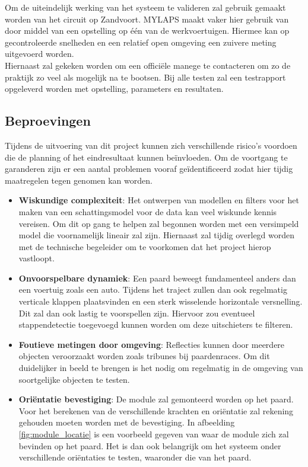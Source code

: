 Om de uiteindelijk werking van het systeem te valideren zal gebruik gemaakt worden van het circuit op Zandvoort. MYLAPS maakt vaker hier gebruik van door middel van een opstelling op één van de werkvoertuigen. Hiermee kan op gecontroleerde snelheden en een relatief open omgeving een zuivere meting uitgevoerd worden.\\

Hiernaast zal gekeken worden om een officiële manege te contacteren om zo de praktijk zo veel als mogelijk na te bootsen. Bij alle testen zal een testrapport opgeleverd worden met opstelling, parameters en resultaten.


\subsection{Beproevingen}
Tijdens de uitvoering van dit project kunnen zich verschillende risico's voordoen die de planning of het eindresultaat kunnen beïnvloeden. Om de voortgang te garanderen zijn er een aantal problemen vooraf geïdentificeerd zodat hier tijdig maatregelen tegen genomen kan worden. \\

\begin{itemize}
    \item \textbf{Wiskundige complexiteit}: Het ontwerpen van modellen en filters voor het maken van een schattingsmodel voor de data kan veel wiskunde kennis vereisen. Om dit op gang te helpen zal begonnen worden met een versimpeld model die voornamelijk lineair zal zijn. Hiernaast zal tijdig overlegd worden met de technische begeleider om te voorkomen dat het project hierop vastloopt.
    \item \textbf{Onvoorspelbare dynamiek}: Een paard beweegt fundamenteel anders dan een voertuig zoals een auto. Tijdens het traject zullen dan ook regelmatig verticale klappen plaatsvinden en een sterk wisselende horizontale versnelling. Dit zal dan ook lastig te voorspellen zijn. Hiervoor zou eventueel stappendetectie toegevoegd kunnen worden om deze uitschieters te filteren.
    \item \textbf{Foutieve metingen door omgeving}: Reflecties kunnen door meerdere objecten veroorzaakt worden zoals tribunes bij paardenraces. Om dit duidelijker in beeld te brengen is het nodig om regelmatig in de omgeving van soortgelijke objecten te testen.
    \item \textbf{Oriëntatie bevestiging}: De module zal gemonteerd worden op het paard. Voor het berekenen van de verschillende krachten en oriëntatie zal rekening gehouden moeten worden met de bevestiging. In afbeelding \ref{fig:module_locatie} is een voorbeeld gegeven van waar de module zich zal bevinden op het paard. Het is dan ook belangrijk om het systeem onder verschillende oriëntaties te testen, waaronder die van het paard.
\end{itemize}

